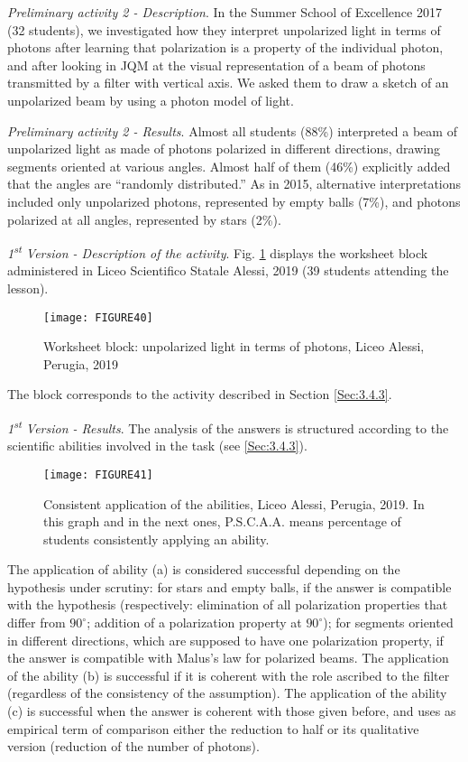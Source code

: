 \documentclass[twocolumn,secnumarabic,amssymb, nobibnotes, aps, prd, nofootinbib]{revtex4-2}
\begin{document}
\emph{Preliminary activity 2 - Description}.  In the Summer School of Excellence 2017 (32 students), we investigated how they interpret unpolarized light in terms of photons after learning that polarization is a property of the individual photon, and after looking in JQM at the visual representation of a beam of photons transmitted by a filter with vertical axis. We asked them to draw a sketch of an unpolarized beam by using a photon model of light.

\emph{Preliminary activity 2 - Results}. Almost all students (88\%) interpreted a beam of unpolarized light as made of photons polarized in different directions, drawing segments oriented at various angles. Almost half of them (46\%) explicitly added that the angles are ``randomly distributed.'' As in 2015, alternative interpretations included only unpolarized photons, represented by empty balls (7\%), and photons polarized at all angles, represented by stars (2\%).

\emph{1\textsuperscript{st} Version - Description of the activity}. Fig. \ref{FIG:40} displays the worksheet block administered in Liceo Scientifico Statale Alessi, 2019 (39 students attending the lesson).
\begin{figure}[!htpb]
    \texttt{[image: FIGURE40]}
    \caption{Worksheet block: unpolarized light in terms of photons, Liceo Alessi, Perugia, 2019}
    \label{FIG:40}
\end{figure}
The block corresponds to the activity described in Section \ref{Sec:3.4.3}.

\emph{1\textsuperscript{st} Version - Results}. The analysis of the answers is structured according to the scientific abilities involved in the task (see \ref{Sec:3.4.3}).
\begin{figure}[!htpb]
    \texttt{[image: FIGURE41]}
    \caption{Consistent application of the abilities, Liceo Alessi, Perugia, 2019. In this graph and in the next ones, P.S.C.A.A. means percentage of students consistently applying an ability.}
    \label{FIG:41}
\end{figure}
The application of ability (a) is considered successful depending on the hypothesis under scrutiny: for stars and empty balls, if the answer is compatible with the hypothesis  (respectively: elimination of all polarization properties that differ from $90^{\circ}$; addition of a polarization property at $90^{\circ}$); for segments oriented in different directions, which are supposed to have one polarization property, if the answer is compatible with Malus's law for polarized beams. The application of the ability (b) is successful if it is coherent with the role ascribed to the filter (regardless of the consistency of the assumption). The application of the ability (c) is successful when the answer is coherent with those given before, and uses as empirical term of comparison either the reduction to half or its qualitative version (reduction of the number of photons).
\end{document}
